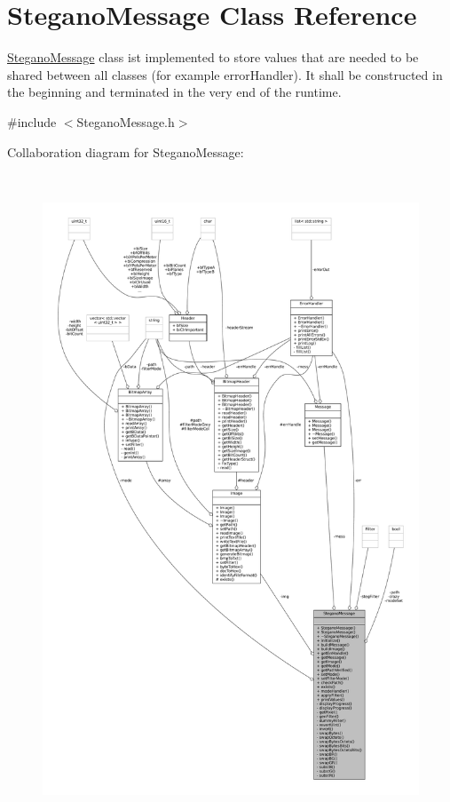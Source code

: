 \hypertarget{classSteganoMessage}{}\section{Stegano\+Message Class Reference}
\label{classSteganoMessage}


\mbox{\hyperlink{classSteganoMessage}{Stegano\+Message}} class ist implemented to store values that are needed to be shared between all classes (for example error\+Handler). It shall be constructed in the beginning and terminated in the very end of the runtime.  




{\ttfamily \#include $<$Stegano\+Message.\+h$>$}



Collaboration diagram for Stegano\+Message\+:
\nopagebreak
\begin{figure}[H]
\begin{center}
\leavevmode
\includegraphics[height=550pt]{classSteganoMessage__coll__graph}
\end{center}
\end{figure}
